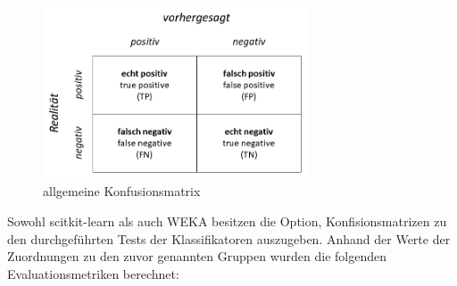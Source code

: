 \begin{figure}[H]
    \centering
    \includegraphics[width=0.7\textwidth]{images/Confusion}
    \caption{allgemeine Konfusionsmatrix\label{fig:confu}}
\end{figure}

Sowohl scitkit-learn als auch WEKA besitzen die Option, Konfisionsmatrizen zu den durchgeführten Tests der Klassifikatoren auszugeben. Anhand der Werte der Zuordnungen zu den zuvor genannten Gruppen wurden die folgenden Evaluationsmetriken berechnet: 

